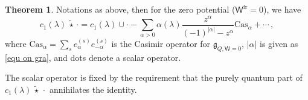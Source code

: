 \documentclass[10pt]{amsart}
\theoremstyle{definition}
\newtheorem{Theorem}{Theorem}[section]
\numberwithin{equation}{section}
\newcommand{\sT}{\mathsf{T}}
\newcommand{\sW}{\mathsf{W}}
\newcommand{\sw}{\mathsf{w}}
\begin{document}
\begin{Theorem}\label{thm on qm div for sym}
Notations as above, then for the zero potential ($\sW^{\mathrm{fr}}=0$), we have
$$c_1(\lambda)\,\widetilde{\star}\, \cdot =c_1(\lambda)\cup \cdot -\sum_{\alpha>0}\alpha(\lambda)\frac{z^\alpha}{(-1)^{|\alpha|}-z^\alpha}\mathrm{Cas}_\alpha+\cdots \,,$$
where $\mathrm{Cas}_\alpha=\sum_{s} e_{\alpha}^{(s)} e_{-\alpha}^{(s)}$ is the Casimir operator for $\mathfrak{g}_{Q,\sW=0}$, $|\alpha|$ is given as \eqref{equ on gra}, and dots denote a scalar operator.
\end{Theorem}

The scalar operator is fixed by the requirement that the purely quantum
part of $c_1(\lambda)\,\widetilde{\star}\, \cdot$ annihilates the identity.
\end{document}
